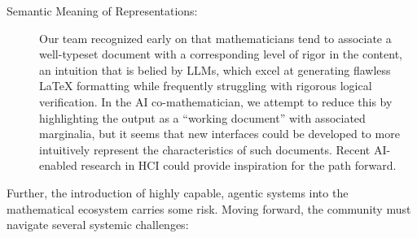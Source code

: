 \documentclass[11pt, a4paper, copyright, gdm]{google}
\begin{document}
\begin{description}
    \item[Semantic Meaning of Representations:] Our team recognized early on that mathematicians tend to associate a well-typeset document with a corresponding level of rigor in the content, an intuition that is belied by LLMs, which excel at generating flawless LaTeX formatting while frequently struggling with rigorous logical verification.
    In the AI co-mathematician, we attempt to reduce this by highlighting the output as a ``working document'' with associated marginalia, but it seems that new interfaces could be developed to more intuitively represent the characteristics of such documents.
    Recent AI-enabled research in HCI \citep[e.g.,][]{pair2025lumi} could provide inspiration for the path forward.
    
\end{description}

Further, the introduction of highly capable, agentic systems into the mathematical ecosystem carries some risk.
Moving forward, the community must navigate several systemic challenges:
\end{document}
